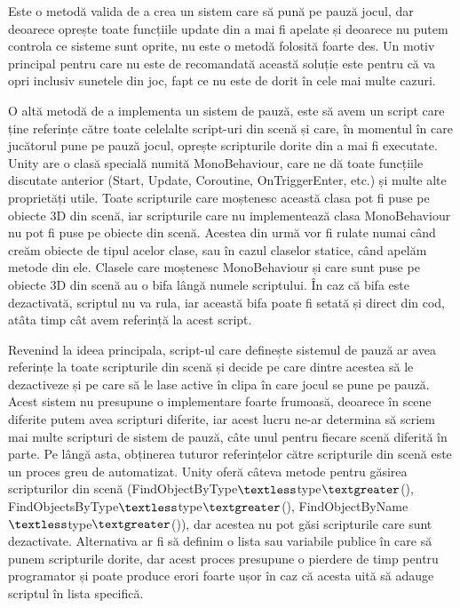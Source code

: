 \documentclass[12pt, a4paper]{article}
\begin{document}
	Este o metodă valida de a crea un sistem care să pună pe pauză jocul, dar deoarece oprește toate funcțiile update din a mai fi apelate și deoarece nu putem controla ce sisteme sunt oprite, nu este o metodă folosită foarte des. Un motiv principal pentru care nu este de recomandată această soluție este pentru că va opri inclusiv sunetele din joc, fapt ce nu este de dorit în cele mai multe cazuri.
	\newline
	
	O altă metodă de a implementa un sistem de pauză, este să avem un script care ține referințe către toate celelalte script-uri din scenă și care, în momentul în care jucătorul pune pe pauză jocul, oprește scripturile dorite din a mai fi executate. Unity are o clasă specială numită MonoBehaviour, care ne dă toate funcțiile discutate anterior (Start, Update, Coroutine, OnTriggerEnter, etc.) și multe alte proprietăți utile. Toate scripturile care moștenesc această clasa pot fi puse pe obiecte 3D din scenă, iar scripturile care nu implementează clasa MonoBehaviour nu pot fi puse pe obiecte din scenă. Acestea din urmă vor fi rulate numai când creăm obiecte de tipul acelor clase, sau în cazul claselor statice, când apelăm metode din ele. Clasele care moștenesc MonoBehaviour și care sunt puse pe obiecte 3D din scenă au o bifa lângă numele scriptului. În caz că bifa este dezactivată, scriptul nu va rula, iar această bifa poate fi setată și direct din cod, atâta timp cât avem referință la acest script. 
	\newline
	
	Revenind la ideea principala, script-ul care definește sistemul de pauză ar avea referințe la toate scripturile din scenă și decide pe care dintre acestea să le dezactiveze și pe care să le lase active în clipa în care jocul se pune pe pauză. Acest sistem nu presupune o implementare foarte frumoasă, deoarece în scene diferite putem avea scripturi diferite, iar acest lucru ne-ar determina să scriem mai multe scripturi de sistem de pauză, câte unul pentru fiecare scenă diferită în parte. Pe lângă asta, obținerea tuturor referințelor către scripturile din scenă este un proces greu de automatizat. Unity oferă câteva metode pentru găsirea scripturilor din scenă (FindObjectByType$\textless$type$\textgreater$(), FindObjectsByType$\textless$type$\textgreater$(), FindObjectByName$\textless$type$\textgreater$()), dar acestea nu pot găsi scripturile care sunt dezactivate. Alternativa ar fi să definim o lista sau variabile publice în care să punem scripturile dorite, dar acest proces presupune o pierdere de timp pentru programator și poate produce erori foarte ușor în caz că acesta uită să adauge scriptul în lista specifică.
	\newline
	
\end{document}
